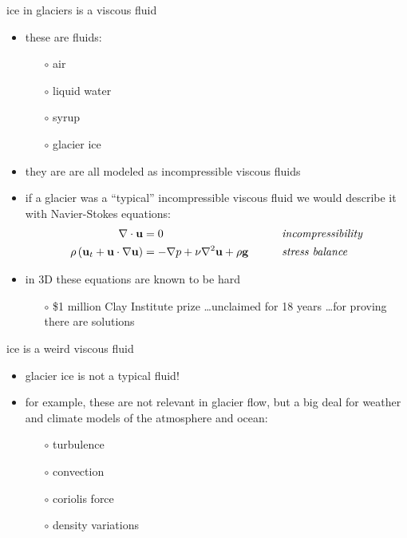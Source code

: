 \documentclass[hide notes,intlimits]{beamer}
\begin{document}
\begin{frame}{ice in glaciers is a viscous fluid}

\begin{itemize}
\item these are fluids:
  \begin{itemize}
  \item[$\circ$] air
  \item[$\circ$] liquid water
  \item[$\circ$] syrup
  \item[$\circ$] glacier ice
  \end{itemize}
\item they are are all modeled as \alert{incompressible viscous fluids}
\item if a glacier was a ``typical'' incompressible viscous fluid we would describe it with Navier-Stokes equations:
\begin{align*}
\nabla \cdot \mathbf{u} &= 0 &&\qquad \text{\emph{incompressibility}} \\
\rho \left(\mathbf{u}_t + \mathbf{u}\cdot\nabla \mathbf{u}\right) &= -\nabla p + \nu \nabla^2 \mathbf{u} + \rho \mathbf{g} &&\qquad \text{\emph{stress balance}}
\end{align*}
\item in 3D these equations are known to be hard
  \begin{itemize}
  \item[$\circ$] \$1 million Clay Institute prize \dots unclaimed for 18 years \dots for proving there are solutions
  \end{itemize}
\end{itemize}
\end{frame}



\begin{frame}{ice is a weird viscous fluid}

\begin{itemize}
\item glacier ice is not a typical fluid!
\item for example, these are \alert{not relevant in glacier flow}, but a big deal for weather and climate models of the atmosphere and ocean:
  \begin{itemize}
  \item[$\circ$] turbulence
  \item[$\circ$] convection
  \item[$\circ$] coriolis force
  \item[$\circ$] density variations
  \end{itemize}
\end{itemize}
\end{frame}
\end{document}
